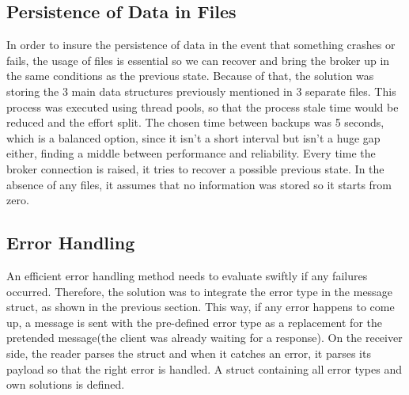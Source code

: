 \subsection{Persistence of Data in Files}

In order to insure the persistence of data in the event that something crashes or fails, the usage of files is essential so we can recover and bring the broker up in the same conditions as the previous state.
Because of that, the solution was storing the 3 main data structures previously mentioned in 3 separate files. This process was executed using thread pools, so that the process stale time would be reduced and the effort split. The chosen time between backups was 5 seconds, which is a balanced option, since it isn't a short interval but isn't a huge gap either, finding a middle between performance and reliability. Every time the broker connection is raised, it tries to recover a possible previous state. In the absence of any files, it assumes that no information was stored so it starts from zero.

\subsection{Error Handling}
An efficient error handling method needs to evaluate swiftly if any failures occurred. Therefore, the solution was to integrate the error type in the message struct, as shown in the previous section. This way, if any error happens to come up, a message is sent with the pre-defined error type as a replacement for the pretended message(the client was already waiting for a response). On the receiver side, the reader parses the struct and when it catches an error, it parses its payload so that the right error is handled. A struct containing all error types and own solutions is defined.